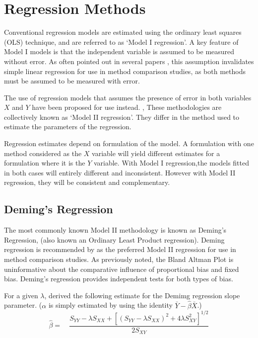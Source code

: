 	\section{Regression Methods}
	Conventional regression models are estimated using the ordinary
	least squares (OLS) technique, and are referred to as `Model I
	regression'\citep{CornCoch,ludbrook97}. A key feature of Model I
	models is that the independent variable is assumed to be measured
	without error. As often pointed out in several papers
	\citep{BA83,ludbrook97}, this assumption invalidates simple linear
	regression for use in method comparison studies, as both methods
	must be assumed to be measured with error.
	
	The use of regression models that assumes the presence of error in
	both variables $X$ and $Y$ have been proposed for use instead.
	\citep{CornCoch,ludbrook97}, These methodologies are collectively
	known as `Model II regression'. They differ in the method used to
	estimate the parameters of the regression.
	
	Regression estimates depend on formulation of the model. A
	formulation with one method considered as the $X$ variable will
	yield different estimates for a formulation where it is the $Y$
	variable. With Model I regression,the models fitted in both cases
	will entirely different and inconsistent. However with Model II
	regression, they will be consistent and complementary.
	
	\subsection{Deming's Regression}
	The most commonly known Model II methodology is known as Deming's
	Regression, (also known an Ordinary Least Product regression).
	Deming regression is recommended by \citet*{CornCoch} as the
	preferred Model II regression for use in method comparison
	studies. As previously noted, the Bland Altman Plot is
	uninformative about the comparative influence of proportional bias
	and fixed bias. Deming's regression provides independent tests for
	both types of bias.
	
	For a given $\lambda$, \citet{Kummel} derived the following
	estimate for the Demimg regression slope parameter. ($\alpha$ is
	simply estimated by using the identity
	$\bar{Y}-\hat{\beta}\bar{X}$.)
	\begin{equation}
	\hat{\beta} =\quad \frac{S_{YY} - \lambda S_{XX}+[(S_{YY} -
		\lambda S_{XX})^{2}+ 4\lambda S^{2}_{XY}]^{1/2}}{2S_{XY}}
	\end{equation}
	
